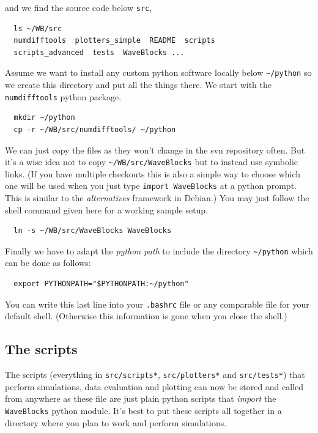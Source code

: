 \documentclass[a4paper,10pt]{report}
\begin{document}
and we find the source code below \texttt{src},

\begin{verbatim}
  ls ~/WB/src
  numdifftools  plotters_simple  README  scripts
  scripts_advanced  tests  WaveBlocks ...
\end{verbatim}

Assume we want to install any custom python software locally below \verb|~/python|
so we create this directory and put all the things there. We start
with the \texttt{numdifftools} python package.

\begin{verbatim}
  mkdir ~/python
  cp -r ~/WB/src/numdifftools/ ~/python
\end{verbatim}

We can just copy the files as they won't change in the svn repository
often. But it's a wise idea not to copy \verb|~/WB/src/WaveBlocks| but
to instead use symbolic links. (If you have multiple checkouts this is also a simple
way to choose which one will be used when you just type \texttt{import WaveBlocks}
at a python prompt. This is similar to the \emph{alternatives} framework in Debian.)
You may just follow the shell command given here for a working sample setup.

\begin{verbatim}
  ln -s ~/WB/src/WaveBlocks WaveBlocks
\end{verbatim}

Finally we have to adapt the \emph{python path} to include the directory
\verb|~/python| which can be done as follows:

\begin{verbatim}
  export PYTHONPATH="$PYTHONPATH:~/python"
\end{verbatim}

You can write this last line into your \texttt{.bashrc} file or any comparable file
for your default shell. (Otherwise this information is gone when you close the
shell.)

\subsection*{The scripts}

The scripts (everything in \texttt{src/scripts*}, \texttt{src/plotters*} and \texttt{src/tests*})
that perform simulations, data evaluation and plotting can now be stored and called
from anywhere as these file are just plain python scripts that \emph{import} the
\texttt{WaveBlocks} python module. It's best to put these scripts all together
in a directory where you plan to work and perform simulations.
\end{document}
